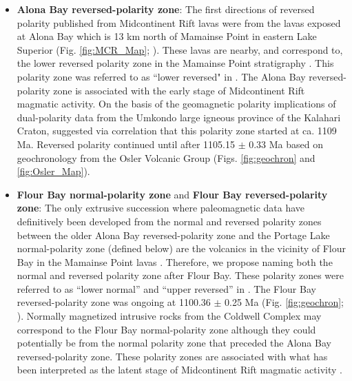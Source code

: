 \documentclass[11pt,letterpaper]{article}
\begin{document}
\begin{itemize}
\item \textbf{Alona Bay reversed-polarity zone}: The first directions of reversed polarity published from Midcontinent Rift lavas were from the lavas exposed at Alona Bay which is 13 km north of Mamainse Point in eastern Lake Superior (Fig. \ref{fig:MCR_Map}; \citealp{Dubois1962a}). These lavas are nearby, and correspond to, the lower reversed polarity zone in the Mamainse Point stratigraphy \citep{Palmer1970a}. This polarity zone was referred to as ``lower reversed" in \cite{Swanson-Hysell2009a,Swanson-Hysell2014a}. The Alona Bay reversed-polarity zone is associated with the early stage of Midcontinent Rift magmatic activity. On the basis of the geomagnetic polarity implications of dual-polarity data from the Umkondo large igneous province of the Kalahari Craton, \cite{Swanson-Hysell2015b} suggested via correlation that this polarity zone started at ca. 1109 Ma. Reversed polarity continued until after 1105.15 $\pm$ 0.33 Ma based on geochronology from the Osler Volcanic Group (Figs. \ref{fig:geochron} and \ref{fig:Osler_Map}).
\item \textbf{Flour Bay normal-polarity zone} and \textbf{Flour Bay reversed-polarity zone}: The only extrusive succession where paleomagnetic data have definitively been developed from the normal and reversed polarity zones between the older Alona Bay reversed-polarity zone and the Portage Lake normal-polarity zone (defined below) are the volcanics in the vicinity of Flour Bay in the Mamainse Point lavas \citep{Palmer1970a,Robertson1973a,Swanson-Hysell2009a}. Therefore, we propose naming both the normal and reversed polarity zone after Flour Bay. These polarity zones were referred to as ``lower normal'' and ``upper reversed'' in \cite{Swanson-Hysell2009a,Swanson-Hysell2014a}. The Flour Bay reversed-polarity zone was ongoing at 1100.36 $\pm$ 0.25 Ma (Fig. \ref{fig:geochron}; \citealp{Swanson-Hysell2014a}). Normally magnetized intrusive rocks from the Coldwell Complex \citep{Kulakov2014a} may correspond to the Flour Bay normal-polarity zone although they could potentially be from the normal polarity zone that preceded the Alona Bay reversed-polarity zone. These polarity zones are associated with what has been interpreted as the latent stage of Midcontinent Rift magmatic activity \citep{Swanson-Hysell2014a}.

\end{itemize}
\end{document}
